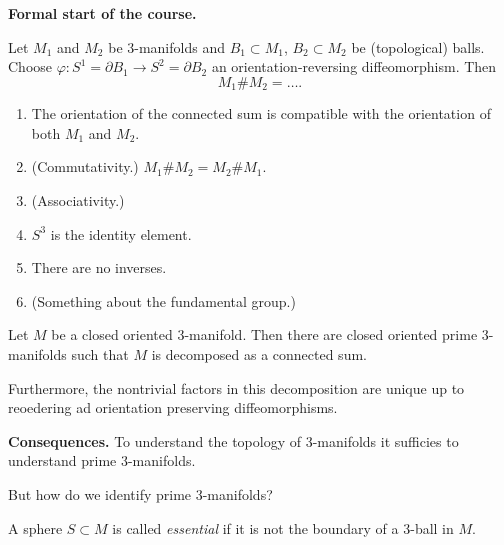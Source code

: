 \medskip\noindent
{\bf Formal start of the course.}

\begin{definition}
\label{definition-connected-sum}
Let $M_1$ and $M_2$ be $3$-manifolds
and $B_1 \subset M_1$, $B_2 \subset M_2$
be (topological) balls. Choose
$\varphi:S^1=\partial B_1 \to S^2 =
\partial B_2$ an orientation-reversing
diffeomorphism. Then
$$
M_1 \# M_2=….
$$
\end{definition}

\begin{proposition}
\label{proposition-prop-connected-sum}
\begin{enumerate}
\item The orientation of the connected sum
is compatible with the orientation of both
$M_1$ and $M_2$.
\item (Commutativity.)
$M_1 \# M_2 = M_2 \# M_1$.
\item (Associativity.)
\item $S^3$ is the identity element.
\item There are no inverses.
\item (Something about the fundamental
group.)
\end{enumerate}
\end{proposition}

\begin{theorem}
\label{theorem-km-decomp}
Let $M$ be a closed oriented 3-manifold.
Then there are closed oriented prime
$3$-manifolds such that $M$ is decomposed as
a connected sum.
\end{theorem}

\begin{theorem}[Kneser 1929]
\label{theorem-kneser29}
Furthermore, the nontrivial factors in this
decomposition are unique up to reoedering ad
orientation preserving diffeomorphisms.
\end{theorem}

\medskip\noindent
{\bf Consequences.} To understand the
topology of 3-manifolds it sufficies
to understand prime 3-manifolds.

But how do we identify prime 3-manifolds?

\begin{definition}
\label{definition-essential-sphere}
A sphere $S \subset M$ is called
{\it  essential} if it is not the boundary
of a 3-ball in $M$.
\end{definition}

